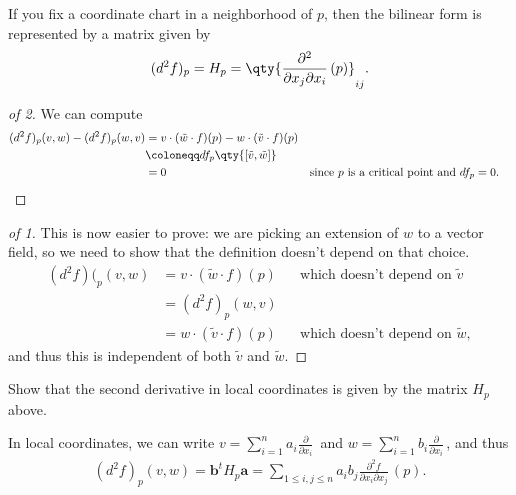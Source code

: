 \begin{remark}

If you fix a coordinate chart in a neighborhood of \(p\), then the
bilinear form is represented by a matrix given by
\begin{align*}
(d^2 f)_p = H_p =  \qty{ {\frac{\partial ^2}{\partial x_j {\partial}x_i}\,}(p)}_{ij}
.\end{align*}

\end{remark}

\begin{proof}[of 2]

We can compute
\begin{align*}
(d^2 f)_p(v, w) - (d^2 f)_p(w, v) 
&= v\cdot (\tilde w \cdot f)(p) - w \cdot (\tilde v \cdot f)(p) \\
&\coloneqq df_p \qty{ [\tilde v, \tilde w]} \\
& = 0 && \text{since $p$ is a critical point and $df_p = 0$}
.\end{align*}

\end{proof}

\begin{proof}[of 1]

This is now easier to prove: we are picking an extension of \(w\) to a
vector field, so we need to show that the definition doesn't depend on
that choice.
\begin{align*}
(d^2 f)(_p(v, w) 
&= v\cdot (\tilde w \cdot f)(p) && \text{which doesn't depend on }\tilde v\\
&= (d^2 f)_p(w, v) \\
&= w\cdot (\tilde v \cdot f)(p) && \text{which doesn't depend on } \tilde w
,\end{align*}
and thus this is independent of both \(\tilde v\) and \(\tilde w\).

\end{proof}

\begin{exercise}[?]

Show that the second derivative in local coordinates is given by the
matrix \(H_p\) above.

\end{exercise}

\begin{remark}

In local coordinates, we can write
\(v = \sum_{i=1}^n a_i {\frac{\partial }{\partial x_i}\,}\) and
\(w = \sum_{i=1}^n b_i {\frac{\partial }{\partial x_i}\,}\), and thus
\begin{align*}
(d^2 f)_p(v, w) = \mathbf{b}^t H_p \mathbf{a} = \sum_{1 \leq i,j \leq n} a_i b_j {\frac{\partial ^2 f}{\partial x_i {\partial}x_j}\,}(p)
.\end{align*}

\end{remark}


